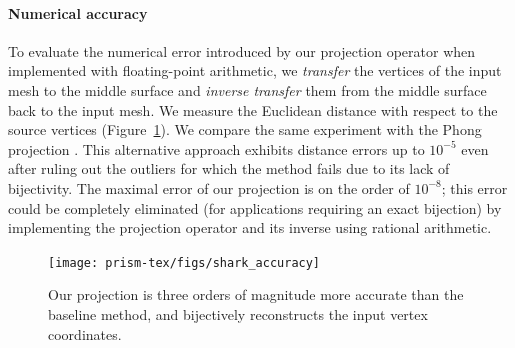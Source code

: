 \paragraph{Numerical accuracy} 
To evaluate the numerical error introduced by  our projection operator {when implemented with floating-point arithmetic}, we \emph{transfer} the vertices of the input mesh to the middle surface and \emph{inverse transfer} them from the middle surface back to the input mesh.  We measure the Euclidean distance with respect to the source vertices (Figure~\ref{prism:fig:shark_accuracy}). 
We compare the same experiment with the Phong projection \cite{kobbelt1998interactive}. This alternative approach exhibits distance errors up to $10^{-5}$ even after ruling out the outliers for which the method fails due to its lack of bijectivity.  The maximal error of our projection is on the order of $10^{-8}$; this error could be completely eliminated (for applications requiring an exact bijection) by implementing the projection operator and its inverse using rational arithmetic.
\begin{figure}
    \centering
    \texttt{[image: prism-tex/figs/shark\_accuracy]}
    \caption{Our projection is three orders of magnitude more accurate than the baseline method, and bijectively reconstructs the input vertex coordinates.}
    \label{prism:fig:shark_accuracy}
    
\end{figure}
